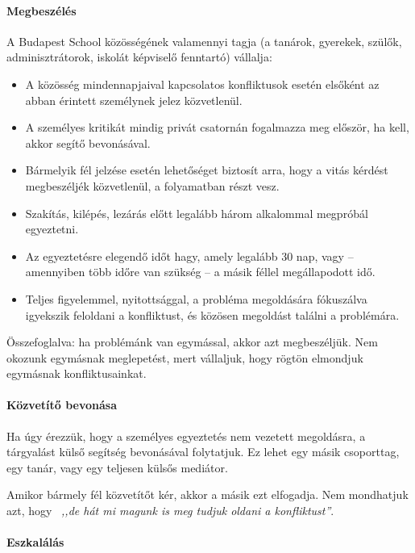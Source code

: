 \paragraph{Megbeszélés}

A Budapest School közösségének valamennyi tagja (a tanárok, gyerekek, szülők, adminisztrátorok, iskolát képviselő fenntartó) vállalja:

\begin{itemize}

      \item A közösség mindennapjaival kapcsolatos konfliktusok esetén elsőként az abban érintett személynek jelez közvetlenül.
      \item A személyes kritikát mindig privát csatornán fogalmazza meg először, ha kell, akkor segítő bevonásával.
      \item   Bármelyik fél jelzése esetén lehetőséget biztosít arra, hogy a vitás kérdést megbeszéljék közvetlenül, a folyamatban részt vesz.
      \item
            Szakítás, kilépés, lezárás előtt legalább három alkalommal megpróbál egyeztetni.
      \item
            Az egyeztetésre elegendő időt hagy, amely legalább 30 nap, vagy -- amennyiben több időre van szükség -- a másik féllel megállapodott idő.
      \item
            Teljes figyelemmel, nyitottsággal, a probléma megoldására fókuszálva igyekszik feloldani a konfliktust, és közösen megoldást találni a problémára.
\end{itemize}

Összefoglalva: ha problémánk van egymással, akkor azt megbeszéljük. Nem okozunk egymásnak meglepetést, mert vállaljuk, hogy rögtön elmondjuk egymásnak konfliktusainkat.

\paragraph{Közvetítő bevonása}

Ha úgy érezzük, hogy a személyes egyeztetés nem vezetett megoldásra, a tárgyalást külső segítség bevonásával folytatjuk. Ez lehet egy másik csoporttag, egy tanár, vagy egy teljesen külsős mediátor.

Amikor bármely fél közvetítőt kér, akkor a másik ezt elfogadja. Nem mondhatjuk azt, hogy  \emph{,,de hát mi magunk is meg tudjuk oldani a konfliktust''}.

\paragraph{Eszkalálás}

